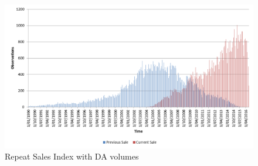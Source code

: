 
\begin{figure}[!ht]
    \centering
    \includegraphics[width=\textwidth]{Figures/prev_cur_sale_dist.png}
    \caption{Repeat Sales Index with DA volumes}
    \label{fig:BMN}
\end{figure}